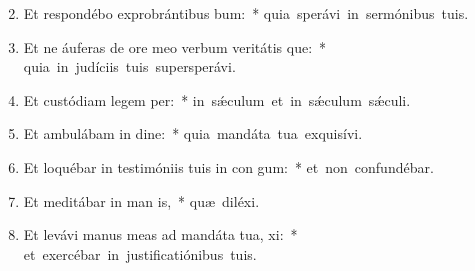 \begin{flushleft}
\begin{enumerate}[leftmargin=*]
\setcounter{enumi}{1}

\item Et respondébo exprobrántibus  bum:~* \mbox{quia sperávi in sermónibus tuis.}
\item Et ne áuferas de ore meo verbum veritátis que:~* \mbox{quia in judíciis tuis supersperávi.}
\item Et custódiam legem  per:~* \mbox{in s\'{\ae}culum et in s\'{\ae}culum s\'{\ae}culi.}
\item Et ambulábam in dine:~* \mbox{quia mandáta tua exquisívi.}
\item Et loquébar in testimóniis tuis in con gum:~* \mbox{et non confundébar.}
\item Et meditábar in man is,~* \mbox{quæ diléxi.}
\item Et levávi manus meas ad mandáta tua,  xi:~* \mbox{et exercébar in justificatiónibus tuis.}


\end{enumerate}
\end{flushleft}


